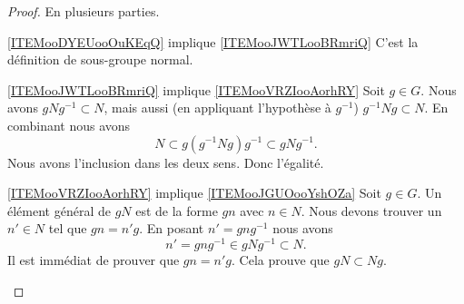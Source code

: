 \begin{proof}
    En plusieurs parties.
    \begin{subproof}
    \item[\ref{ITEMooDYEUooOuKEqQ} implique \ref{ITEMooJWTLooBRmriQ}]
        C'est la définition de sous-groupe normal.
    \item[\ref{ITEMooJWTLooBRmriQ} implique \ref{ITEMooVRZIooAorhRY}]
        Soit \( g\in G\). Nous avons \( gNg^{-1}\subset N\), mais aussi (en appliquant l'hypothèse à \( g^{-1}\)) \( g^{-1}Ng\subset N\). En combinant nous avons
        \begin{equation}
            N\subset g(g^{-1} Ng)g^{-1}\subset g Ng^{-1}.
        \end{equation}
        Nous avons l'inclusion dans les deux sens. Donc l'égalité.
    \item[\ref{ITEMooVRZIooAorhRY} implique \ref{ITEMooJGUOooYshOZa}]
        Soit \( g\in G\). Un élément général de \( gN\) est de la forme \( gn\) avec \( n\in N\). Nous devons trouver un \( n'\in N\) tel que \( gn=n'g\). En posant \( n'=gng^{-1}\) nous avons
        \begin{equation}
            n'=gng^{-1}\in gNg^{-1}\subset N.
        \end{equation}
        Il est immédiat de prouver que \( gn=n'g\). Cela prouve que \( gN\subset Ng\).


\end{subproof}
\end{proof}
